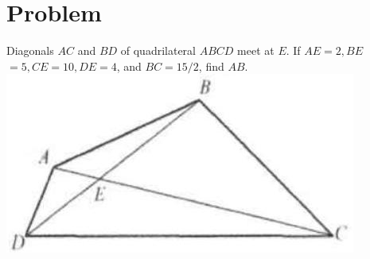 \documentclass{article}
\begin{document}
\section*{Problem}
Diagonals \(A C\) and \(B D\) of quadrilateral \(A B C D\) meet at \(E\). If \(A E=2, B E\) \(=5, C E=10, D E=4\), and \(B C=15 / 2\), find \(A B\).\\
\centering
\includegraphics[width=\textwidth]{images/207.jpg}
\end{document}
